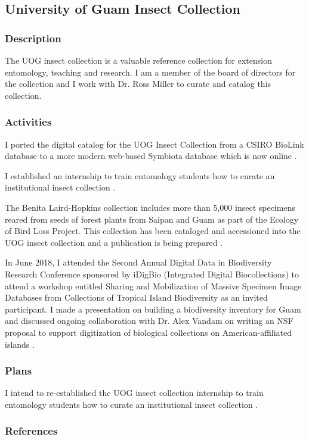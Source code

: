 \subsection{University of Guam Insect Collection}
\begin{refsection}
	
\subsubsection{Description}

The UOG insect collection is a valuable reference collection for extension
entomology, teaching and research. I am a member of the board of directors
for the collection and I work with Dr. Ross Miller to curate and catalog
this collection.

\subsubsection{Activities}

I ported the digital catalog for the UOG Insect Collection from a
CSIRO BioLink database to a more modern web-based Symbiota database
which is now online \cite{moore_scan_2018}.

I established an internship to train entomology students how to curate
an institutional insect collection \cite{moore_internship_2018}.

The Benita Laird-Hopkins collection includes more than 5,000 insect
specimens reared from seeds of forest plants from Saipan and Guam
as part of the Ecology of Bird Loss Project. This collection has been
cataloged and accessioned into the UOG insect collection and a publication
is being prepared \cite{laird-hopkins_[preparation]_2018}.

In June 2018, I attended the Second Annual Digital Data in Biodiversity
Research Conference sponsored by iDigBio (Integrated Digital Biocollections)
to attend a workshop entitled Sharing and Mobilization of Massive
Specimen Image Databases from Collections of Tropical Island Biodiversity
as an invited participant. I made a presentation on building a biodiversity
inventory for Guam \cite{moore_building_2018-1} and discussed ongoing
collaboration with Dr. Alex Vandam on writing an NSF proposal to support
digitization of biological collections on American-affiliated islands
\cite{moore_trip_2018}.

\subsubsection{Plans}

I intend to re-established the UOG insect collection internship to train entomology students how to curate an institutional insect collection \cite{moore_internship_2018}.

\subsubsection{References}
\printbibliography[heading=none]
\end{refsection}

